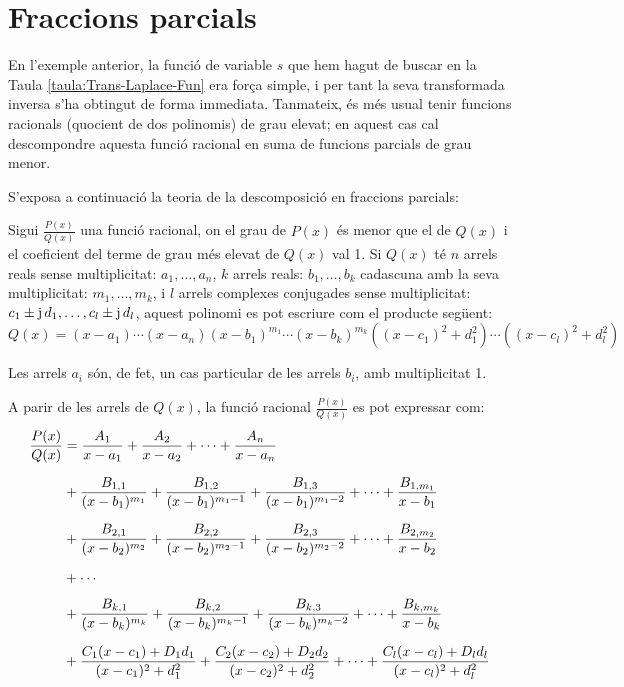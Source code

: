 \section{Fraccions parcials}

En l'exemple anterior, la funció de variable $s$ que hem hagut de
buscar en la Taula \vref{taula:Trans-Laplace-Fun} era força simple, i
per tant la seva transformada inversa s'ha obtingut de forma
immediata. Tanmateix, és més usual tenir funcions racionals
(quocient de dos polinomis) de grau elevat; en aquest cas cal
descompondre aquesta funció racional en suma de funcions parcials de
grau menor.

S'exposa a continuació la teoria de la descomposició en fraccions
parcials:

Sigui $\frac{P(x)}{Q(x)}$ una funció racional, on el grau de $P(x)$
és menor que el de $Q(x)$ i el coeficient del terme de grau més
elevat de $Q(x)$ val 1. Si $Q(x)$ té $n$ arrels reals sense
multiplicitat: $a_1,\ldots,a_n$, $k$ arrels reals: $b_1,\ldots,b_k$
cadascuna amb la seva multiplicitat: $m_1,\ldots,m_k$, i $l$ arrels
complexes conjugades sense multiplicitat: $c_1\pm
\mathrm{j}\,d_1,\ldots,c_l\pm \mathrm{j}\,d_l$, aquest polinomi es pot escriure
com el producte següent:
\begin{equation}
    Q(x)= (x-a_1) \cdots (x-a_n)(x-b_1)^{m_1} \cdots (x-b_k)^{m_k}
    ((x-c_1)^2+d_1^2)\cdots((x-c_l)^2+d_l^2)
\end{equation}

Les arrels $a_i$ són, de fet, un cas particular de les arrels $b_i$,
amb multiplicitat 1.

A parir de les arrels de $Q(x)$, la funció  racional
$\frac{P(x)}{Q(x)}$ es pot expressar com:
\begin{equation}\begin{split}
    \frac{P(x)}{Q(x)} &= \frac{A_1}{x-a_1} + \frac{A_2}{x-a_2}
    + \cdots + \frac{A_n}{x-a_n}  \\[1.5ex]
   &+ \frac{B_{1,1}}{(x-b_1)^{m_1}} + \frac{B_{1,2}}{(x-b_1)^{m_1-1}}
   + \frac{B_{1,3}}{(x-b_1)^{m_1-2}} + \cdots +
   \frac{B_{1,m_1}}{x-b_1} \\[1.5ex]
&+ \frac{B_{2,1}}{(x-b_2)^{m_2}} + \frac{B_{2,2}}{(x-b_2)^{m_2-1}}
   + \frac{B_{2,3}}{(x-b_2)^{m_2-2}} + \cdots  +
   \frac{B_{2,m_2}}{x-b_2} \\[1.5ex]
   &+ \cdots {\tiny }\\[1ex]
&+ \frac{B_{k,1}}{(x-b_k)^{m_k}} + \frac{B_{k,2}}{(x-b_k)^{m_k-1}}
   + \frac{B_{k,3}}{(x-b_k)^{m_k-2}} + \cdots +
   \frac{B_{k,m_k}}{x-b_k}\\[1.5ex]
&+ \frac{C_1(x-c_1)+D_1 d_1}{(x-c_1)^2+d_1^2}+ \frac{C_2(x-c_2)+D_2
d_2}{(x-c_2)^2+d_2^2} +  \cdots +\frac{C_l(x-c_l)+D_l d_l}{(x-c_l)^2+d_l^2}\\[1.5ex]
\end{split}\end{equation}

